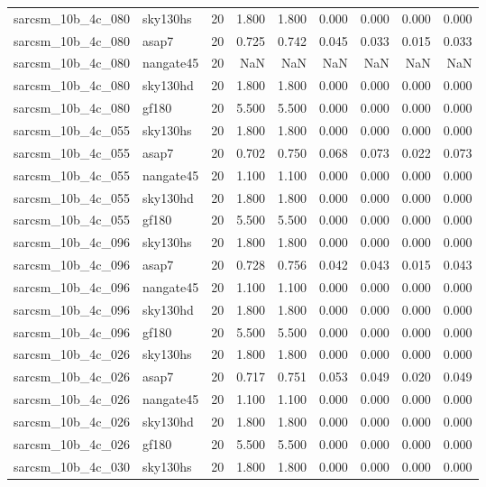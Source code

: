 \begin{tabular}{llrrrrrrr}
sarcsm\_10b\_4c\_080 & sky130hs & 20 & 1.800 & 1.800 & 0.000 & 0.000 & 0.000 & 0.000 \\
sarcsm\_10b\_4c\_080 & asap7 & 20 & 0.725 & 0.742 & 0.045 & 0.033 & 0.015 & 0.033 \\
sarcsm\_10b\_4c\_080 & nangate45 & 20 & NaN & NaN & NaN & NaN & NaN & NaN \\
sarcsm\_10b\_4c\_080 & sky130hd & 20 & 1.800 & 1.800 & 0.000 & 0.000 & 0.000 & 0.000 \\
sarcsm\_10b\_4c\_080 & gf180 & 20 & 5.500 & 5.500 & 0.000 & 0.000 & 0.000 & 0.000 \\
sarcsm\_10b\_4c\_055 & sky130hs & 20 & 1.800 & 1.800 & 0.000 & 0.000 & 0.000 & 0.000 \\
sarcsm\_10b\_4c\_055 & asap7 & 20 & 0.702 & 0.750 & 0.068 & 0.073 & 0.022 & 0.073 \\
sarcsm\_10b\_4c\_055 & nangate45 & 20 & 1.100 & 1.100 & 0.000 & 0.000 & 0.000 & 0.000 \\
sarcsm\_10b\_4c\_055 & sky130hd & 20 & 1.800 & 1.800 & 0.000 & 0.000 & 0.000 & 0.000 \\
sarcsm\_10b\_4c\_055 & gf180 & 20 & 5.500 & 5.500 & 0.000 & 0.000 & 0.000 & 0.000 \\
sarcsm\_10b\_4c\_096 & sky130hs & 20 & 1.800 & 1.800 & 0.000 & 0.000 & 0.000 & 0.000 \\
sarcsm\_10b\_4c\_096 & asap7 & 20 & 0.728 & 0.756 & 0.042 & 0.043 & 0.015 & 0.043 \\
sarcsm\_10b\_4c\_096 & nangate45 & 20 & 1.100 & 1.100 & 0.000 & 0.000 & 0.000 & 0.000 \\
sarcsm\_10b\_4c\_096 & sky130hd & 20 & 1.800 & 1.800 & 0.000 & 0.000 & 0.000 & 0.000 \\
sarcsm\_10b\_4c\_096 & gf180 & 20 & 5.500 & 5.500 & 0.000 & 0.000 & 0.000 & 0.000 \\
sarcsm\_10b\_4c\_026 & sky130hs & 20 & 1.800 & 1.800 & 0.000 & 0.000 & 0.000 & 0.000 \\
sarcsm\_10b\_4c\_026 & asap7 & 20 & 0.717 & 0.751 & 0.053 & 0.049 & 0.020 & 0.049 \\
sarcsm\_10b\_4c\_026 & nangate45 & 20 & 1.100 & 1.100 & 0.000 & 0.000 & 0.000 & 0.000 \\
sarcsm\_10b\_4c\_026 & sky130hd & 20 & 1.800 & 1.800 & 0.000 & 0.000 & 0.000 & 0.000 \\
sarcsm\_10b\_4c\_026 & gf180 & 20 & 5.500 & 5.500 & 0.000 & 0.000 & 0.000 & 0.000 \\
sarcsm\_10b\_4c\_030 & sky130hs & 20 & 1.800 & 1.800 & 0.000 & 0.000 & 0.000 & 0.000 \\

\end{tabular}
